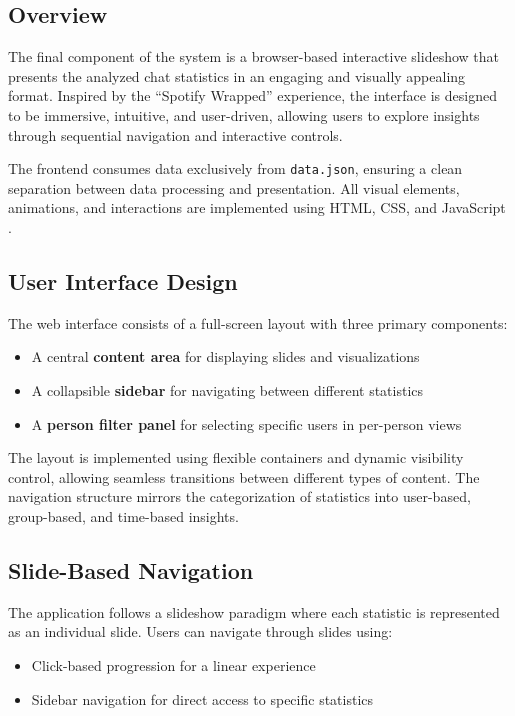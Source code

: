 \documentclass[11pt,a4paper]{article}
\begin{document}
\subsection{Overview}
The final component of the system is a browser-based interactive slideshow that presents the analyzed chat statistics in an engaging and visually appealing format. Inspired by the “Spotify Wrapped”\cite{spotifywrapped} experience, the interface is designed to be immersive, intuitive, and user-driven, allowing users to explore insights through sequential navigation and interactive controls.

The frontend consumes data exclusively from \texttt{data.json}, ensuring a clean separation between data processing and presentation. All visual elements, animations, and interactions are implemented using HTML, CSS, and JavaScript \cite{html,css,javascript}.

\subsection{User Interface Design}
The web interface consists of a full-screen layout with three primary components:
\begin{itemize}
\item A central \textbf{content area} for displaying slides and visualizations
\item A collapsible \textbf{sidebar} for navigating between different statistics
\item A \textbf{person filter panel} for selecting specific users in per-person views
\end{itemize}

The layout is implemented using flexible containers and dynamic visibility control, allowing seamless transitions between different types of content. The navigation structure mirrors the categorization of statistics into user-based, group-based, and time-based insights.

\subsection{Slide-Based Navigation}
The application follows a slideshow paradigm where each statistic is represented as an individual slide. Users can navigate through slides using:
\begin{itemize}
\item Click-based progression for a linear experience
\item Sidebar navigation for direct access to specific statistics
\end{itemize}
\end{document}

